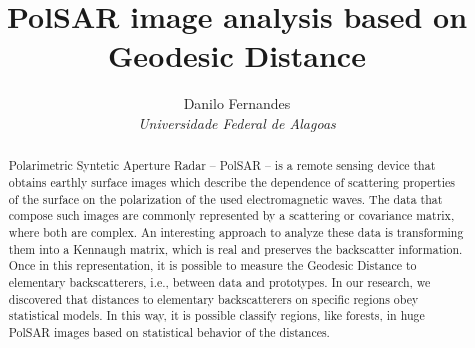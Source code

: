 \documentclass[12pt]{article}
\title{\textbf{\Large PolSAR image analysis based on Geodesic Distance}}
\author{\large
Danilo Fernandes \\ \textit{\large Universidade Federal de Alagoas}
}
\date{}
\begin{document}
\maketitle

\begin{abstract}

Polarimetric Syntetic Aperture Radar -- PolSAR -- is a remote sensing device that obtains earthly surface images which describe the dependence of scattering properties of the surface on the polarization of the used electromagnetic waves. 
The data that compose such images are commonly represented by a scattering or covariance matrix, where both are complex. 
An interesting approach to analyze these data is transforming them into a Kennaugh matrix, which is real and preserves the backscatter information.
Once in this representation, it is possible to measure the Geodesic Distance to elementary backscatterers, i.e., between data and prototypes. 
In our research, we discovered that distances to elementary backscatterers on specific regions obey statistical models. 
In this way, it is possible classify regions, like forests, in huge PolSAR images based on statistical behavior of the distances.
\end{abstract}
\end{document}
